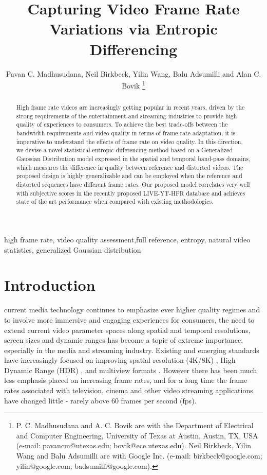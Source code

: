 \documentclass[journal]{IEEEtran}
\begin{document}
\title{Capturing Video Frame Rate Variations via Entropic Differencing}


\author{Pavan C. Madhusudana, Neil Birkbeck, Yilin Wang,  Balu Adsumilli and Alan C. Bovik 
	\thanks{P. C. Madhusudana and A. C. Bovik are with the Department of Electrical and
Computer Engineering, University of Texas at Austin, Austin, TX, USA (e-mail:
pavancm@utexas.edu; bovik@ece.utexas.edu). Neil Birkbeck, Yilin Wang
and Balu Adsumilli are with Google Inc. (e-mail: birkbeck@google.com; yilin@google.com; badsumilli@google.com).}}




\maketitle

\begin{abstract}
High frame rate videos are increasingly getting popular in recent years, driven by the strong requirements of the entertainment and streaming industries to provide high quality of experiences to consumers. To achieve the best trade-offs between the bandwidth requirements and video quality in terms of frame rate adaptation, it is imperative to understand the effects of frame rate on video quality. In this direction, we devise a novel statistical entropic differencing method based on a Generalized Gaussian Distribution model expressed in the spatial and temporal band-pass domains, which measures the difference in quality between reference and distorted videos. The proposed design is highly generalizable and can be employed when the reference and distorted sequences have different frame rates. Our proposed model correlates very well with subjective scores in the recently proposed LIVE-YT-HFR database and achieves state of the art performance when compared with existing methodologies.
\end{abstract}

\begin{IEEEkeywords}
high frame rate, video quality assessment,full reference, entropy, natural video statistics, generalized Gaussian distribution
\end{IEEEkeywords}

\section{Introduction}
 current media technology continues to emphasize ever higher quality regimes and to involve more immersive and engaging experiences for consumers, the need to extend current video parameter spaces along spatial and temporal resolutions, screen sizes and dynamic ranges has become a topic of extreme importance, especially in the media and streaming industry. Existing and emerging standards have increasingly focused on improving spatial resolution (4K/8K) \cite{ge2017toward}, High Dynamic Range (HDR) \cite{mai2010optimizing,kundu2017no}, and multiview formats \cite{smolic2007coding,de2013toward}. However there has been much less emphasis placed on increasing frame rates, and for a long time the frame rates associated with television, cinema and other video streaming applications have changed little - rarely above 60 frames per second (fps).
\end{document}
